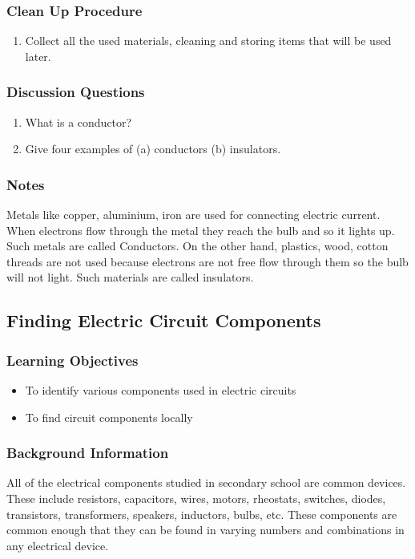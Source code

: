\subsubsection*{Clean Up Procedure}
\begin{enumerate}
\item{Collect all the used materials, cleaning and storing items that will be used later.} 
\end{enumerate}

\subsubsection*{Discussion Questions}
\begin{enumerate}
\item{What is a conductor?}
\item{Give four examples of (a) conductors (b) insulators.} 
\end{enumerate}

\subsubsection*{Notes}
Metals like copper, aluminium, iron are used for connecting electric current. When electrons flow through the metal they reach the bulb and so it lights up. Such metals are called Conductors. On the other hand, plastics, wood, cotton threads are not used because electrons are not free flow through them so the bulb will not light. Such materials are called insulators. 


\subsection{Finding Electric Circuit Components}

\subsubsection*{Learning Objectives}
\begin{itemize}
\item{To identify various components used in electric circuits} 
\item{To find circuit components locally} 
\end{itemize}

\subsubsection*{Background Information}
All of the electrical components studied in secondary school are common devices. These include resistors, capacitors, wires, motors, rheostats, switches, diodes, transistors, transformers, speakers, inductors, bulbs, etc. These components are common enough that they can be found in varying numbers and combinations in any electrical device. 

